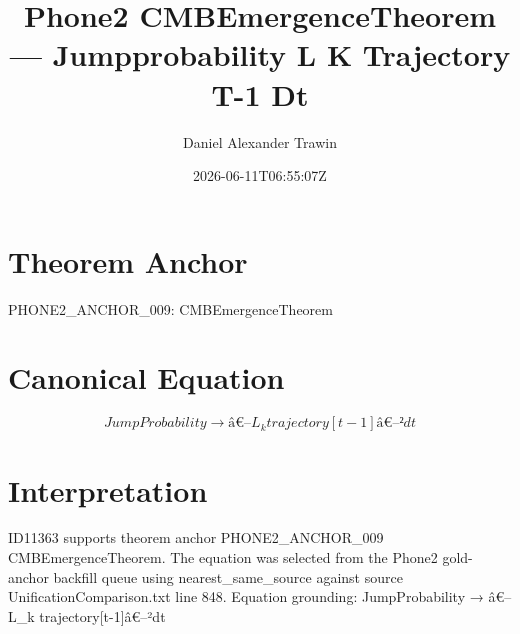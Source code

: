\documentclass[11pt]{article}
\title{Phone2 CMBEmergenceTheorem — Jumpprobability L K Trajectory T-1 Dt}
\author{Daniel Alexander Trawin}
\date{2026-06-11T06:55:07Z}
\begin{document}
\maketitle
\section*{Theorem Anchor}
PHONE2_ANCHOR_009: CMBEmergenceTheorem
\section*{Canonical Equation}
\[
JumpProbability → â€–L_k trajectory[t-1]â€–²dt
\]
\section*{Interpretation}
ID11363 supports theorem anchor PHONE2_ANCHOR_009 CMBEmergenceTheorem. The equation was selected from the Phone2 gold-anchor backfill queue using nearest_same_source against source UnificationComparison.txt line 848. Equation grounding: JumpProbability → â€–L_k trajectory[t-1]â€–²dt
\end{document}
